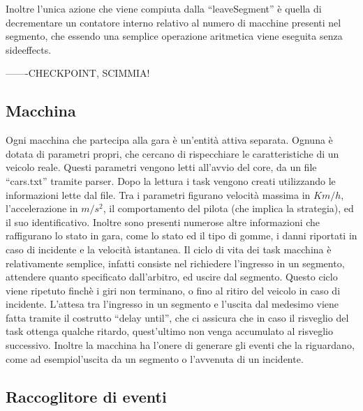 Inoltre l’unica azione che viene compiuta dalla “leaveSegment” è quella di decrementare un contatore interno relativo al numero di macchine presenti nel segmento, che essendo una semplice operazione aritmetica viene eseguita senza sideeffects.


-------CHECKPOINT, SCIMMIA!
\subsection{Macchina}

Ogni macchina che partecipa alla gara è un’entità attiva separata. Ognuna è dotata di parametri propri, che cercano di rispecchiare le caratteristiche di un veicolo reale. Questi parametri vengono letti all’avvio del core, da un file “cars.txt” tramite parser. Dopo la lettura i task vengono creati utilizzando le informazioni lette dal file. Tra i parametri figurano velocità massima in $Km/h$, l’accelerazione in $m/s^2$, il comportamento del pilota (che implica la strategia), ed il suo identificativo. Inoltre sono presenti numerose altre informazioni che raffigurano lo stato in gara, come lo stato ed il tipo di gomme, i danni riportati in caso di incidente e la velocità istantanea.
Il ciclo di vita dei task macchina è relativamente semplice, infatti consiste nel richiedere l’ingresso in un segmento, attendere quanto specificato dall’arbitro, ed uscire dal segmento.
Questo ciclo viene ripetuto finchè i giri non terminano, o fino al ritiro del veicolo in caso di incidente.
L’attesa tra l’ingresso in un segmento e l’uscita dal medesimo viene fatta tramite il costrutto “delay until”, che ci assicura che in caso il risveglio del task ottenga qualche ritardo, quest’ultimo non venga accumulato al risveglio successivo.
Inoltre la macchina ha l’onere di generare gli eventi che la riguardano, come ad esempiol’uscita da un segmento o l’avvenuta di un incidente.

\subsection{Raccoglitore di eventi}


